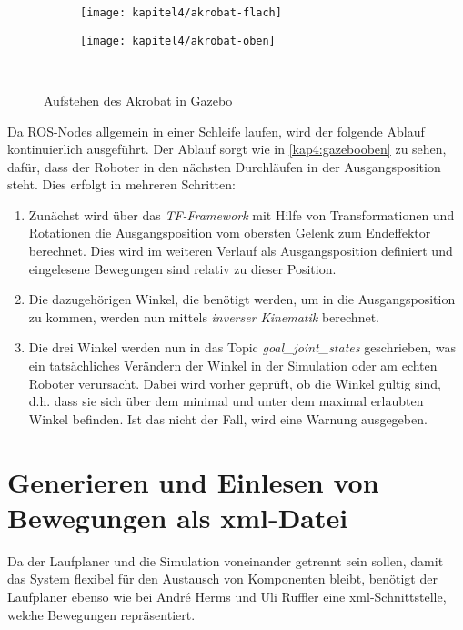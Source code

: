 \begin{itemize}
\begin{figure}[b!]
  \centering
  \begin{subfigure}[b]{.4\linewidth}
    \centering
    \texttt{[image: kapitel4/akrobat-flach]}
    \label{kap4:gazeboflach}
  \end{subfigure}%
  \qquad
  \begin{subfigure}[b]{.4\linewidth}
    \centering
    \texttt{[image: kapitel4/akrobat-oben]}
    \label{kap4:gazebooben}
  \end{subfigure}\\
  \caption{Aufstehen des Akrobat in Gazebo}
  \label{kap4gazebo}
\end{figure}

Da \ac{ROS}-Nodes allgemein in einer Schleife laufen, wird der folgende Ablauf kontinuierlich ausgeführt. Der Ablauf sorgt wie in \autoref{kap4:gazebooben} zu sehen, dafür, dass der Roboter in den nächsten Durchläufen in der Ausgangsposition steht. Dies erfolgt in mehreren Schritten: 
\begin{enumerate}
  \item Zunächst wird über das \emph{TF-Framework} mit Hilfe von Transformationen und Rotationen die Ausgangsposition vom obersten Gelenk zum Endeffektor berechnet. Dies wird im weiteren Verlauf als Ausgangsposition definiert und eingelesene Bewegungen sind relativ zu dieser Position.
  \item Die dazugehörigen Winkel, die benötigt werden, um in die Ausgangsposition zu kommen, werden nun mittels \emph{inverser Kinematik} berechnet.
  \item Die drei Winkel werden nun in das Topic \emph{goal\_joint\_states} geschrieben, was ein tatsächliches Verändern der Winkel in der Simulation oder am echten Roboter verursacht. Dabei wird vorher geprüft, ob die Winkel gültig sind, d.h. dass sie sich über dem minimal und unter dem maximal erlaubten Winkel befinden. Ist das nicht der Fall, wird eine Warnung ausgegeben.
\end{enumerate}

\section{Generieren und Einlesen von Bewegungen als xml-Datei}

Da der Laufplaner und die Simulation voneinander getrennt sein sollen, damit das System flexibel für den Austausch von Komponenten bleibt, benötigt der Laufplaner ebenso wie bei André Herms \autocite{herms2004} und Uli Ruffler \autocite{ruffler2006} eine xml-Schnittstelle, welche Bewegungen repräsentiert.


\end{itemize}
